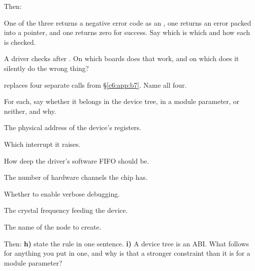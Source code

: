  

 

 

Then:

 One of the three returns a negative error code as an , one returns an error
packed into a pointer, and one returns zero for success. Say which is which and how each is checked.

 A driver checks  after . On which boards does that
work, and on which does it silently do the wrong thing?

  replaces four separate calls from \S\ref{c6:app:b7}.
Name all four.

\label{c10:ex:5}

For each, say whether it belongs in the device tree, in a module parameter, or neither, and why.

 The physical address of the device's registers.

 Which interrupt it raises.

 How deep the driver's software FIFO should be.

 The number of hardware channels the chip has.

 Whether to enable verbose debugging.

 The crystal frequency feeding the device.

 The name of the  node to create.

Then: \textbf{h)} state the rule in one sentence. \textbf{i)} A device tree is an ABI. What follows
for anything you put in one, and why is that a stronger constraint than it is for a module
parameter?

\label{c10:ex:6}

